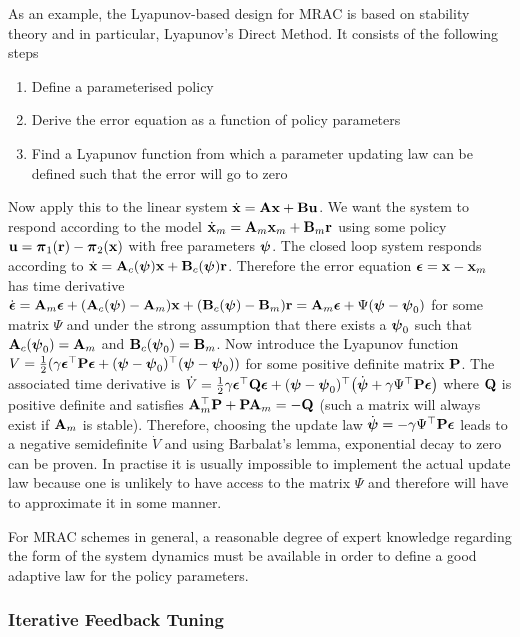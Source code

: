 As an example, the Lyapunov-based design for MRAC is based on stability theory and in particular, Lyapunov's Direct Method. It consists of the following steps
\begin{enumerate}[	(1)]
\item Define a parameterised policy
\item Derive the error equation as a function of policy parameters
\item Find a Lyapunov function from which a parameter updating law can be defined such that the error will go to zero
\end{enumerate}
Now apply this to the linear system $\dot{\mathbf{x}} = \mathbf{A}\mathbf{x} + \mathbf{B}\mathbf{u}$. We want the system to respond according to the model $\dot{\mathbf{x}}_m = \mathbf{A}_m\mathbf{x}_m + \mathbf{B}_m\mathbf{r}$ using some policy $\mathbf{u} = \boldsymbol{\pi}_1(\mathbf{r}) - \boldsymbol{\pi}_2(\mathbf{x})$ with free parameters $\boldsymbol{\psi}$. The closed loop system responds according to $\dot{\mathbf{x}} = \mathbf{A}_c(\boldsymbol{\psi})\mathbf{x} + \mathbf{B}_c(\boldsymbol{\psi}) \mathbf{r}$. Therefore the error equation $\boldsymbol{\epsilon} = \mathbf{x} - \mathbf{x}_m$ has time derivative $\dot{\boldsymbol{\epsilon}} = \mathbf{A}_m \boldsymbol{\epsilon} + (\mathbf{A}_c(\boldsymbol{\psi}) - \mathbf{A}_m)\mathbf{x} + (\mathbf{B}_c(\boldsymbol{\psi}) - \mathbf{B}_m)\mathbf{r} = \mathbf{A}_m \boldsymbol{\epsilon} + \Psi(\boldsymbol{\psi} - \boldsymbol{\psi}_0)$ for some matrix $\Psi$ and under the strong assumption that there exists a $\boldsymbol{\psi}_0$ such that $\mathbf{A}_c(\boldsymbol{\psi}_0) = \mathbf{A}_m$ and $\mathbf{B}_c(\boldsymbol{\psi}_0) = \mathbf{B}_m$. Now introduce the Lyapunov function $V = \frac{1}{2}(\gamma \boldsymbol{\epsilon}^\top \mathbf{P} \boldsymbol{\epsilon} + (\boldsymbol{\psi} - \boldsymbol{\psi}_0)^\top(\boldsymbol{\psi} - \boldsymbol{\psi}_0))$ for some positive definite matrix $\mathbf{P}$. The associated time derivative is $\dot V = \frac{1}{2}\gamma \boldsymbol{\epsilon}^\top \mathbf{Q} \boldsymbol{\epsilon} + (\boldsymbol{\psi} - \boldsymbol{\psi}_0)^\top \big(\dot{\boldsymbol{\psi}} + \gamma\Psi^\top \mathbf{P} \boldsymbol{\epsilon} \big)$ where $\mathbf{Q}$ is positive definite and satisfies $\mathbf{A}_m^\top \mathbf{P} + \mathbf{P} \mathbf{A}_m = -\mathbf{Q}$ (such a matrix will always exist if $\mathbf{A}_m$ is stable). Therefore, choosing the update law $\dot{\boldsymbol{\psi}} = - \gamma \Psi^\top \mathbf{P} \boldsymbol{\epsilon}$ leads to a negative semidefinite $\dot V$ and using Barbalat's lemma, exponential decay to zero can be proven.
%
In practise it is usually impossible to implement the actual update law because one is unlikely to have access to the matrix $\Psi$ and therefore will have to approximate it in some manner.


For MRAC schemes in general, a reasonable degree of expert knowledge regarding the form of the system dynamics must be available in order to define a good adaptive law for the policy parameters. 



\subsubsection{Iterative Feedback Tuning}

